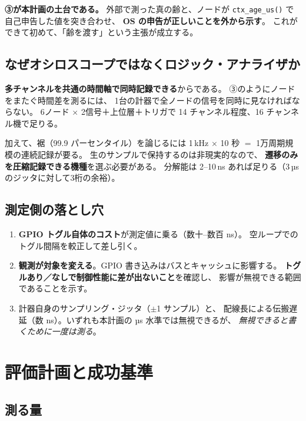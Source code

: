 \documentclass[11pt,a4paper]{article}
\newcommand{\code}[1]{\texttt{#1}}
\newcommand{\prob}[1]{\textbf{\textcolor{red!55!black}{#1}}}
\newcommand{\keyp}[1]{\textbf{\textcolor{blue!45!black}{#1}}}
\begin{document}
\noindent
\keyp{③が本計画の土台である。}
外部で測った真の齢と、ノードが \code{ctx\_age\_us()} で自己申告した値を突き合わせ、
\keyp{OS の申告が正しいことを外から示す}。
これができて初めて、「齢を渡す」という主張が成立する。

\subsection{なぜオシロスコープではなくロジック・アナライザか}

\keyp{多チャンネルを共通の時間軸で同時記録できる}からである。
③のようにノードをまたぐ時間差を測るには、
1台の計器で全ノードの信号を同時に見なければならない。
6ノード $\times$ 2信号＋上位層＋トリガで 14 チャンネル程度、16 チャンネル機で足りる。

加えて、裾（99.9 パーセンタイル）を論じるには
1\,kHz $\times$ 10 秒 $=$ 1万周期規模の連続記録が要る。
生のサンプルで保持するのは非現実的なので、
\keyp{遷移のみを圧縮記録できる機種}を選ぶ必要がある。
分解能は 2--10\,ns あれば足りる（3\,µs のジッタに対して3桁の余裕）。

\subsection{測定側の落とし穴}

\begin{enumerate}[leftmargin=1.6em,itemsep=3pt]
  \item \prob{GPIO トグル自体のコスト}が測定値に乗る（数十--数百 ns）。
        空ループでのトグル間隔を較正して差し引く。
  \item \prob{観測が対象を変える}。GPIO 書き込みはバスとキャッシュに影響する。
        \keyp{トグルあり／なしで制御性能に差が出ないこと}を確認し、
        影響が無視できる範囲であることを示す。
  \item 計器自身のサンプリング・ジッタ（$\pm$1 サンプル）と、
        配線長による伝搬遅延（数 ns）。いずれも本計画の µs 水準では無視できるが、
        \emph{無視できると書くために一度は測る}。
\end{enumerate}


\section{評価計画と成功基準}

\subsection{測る量}
\end{document}
